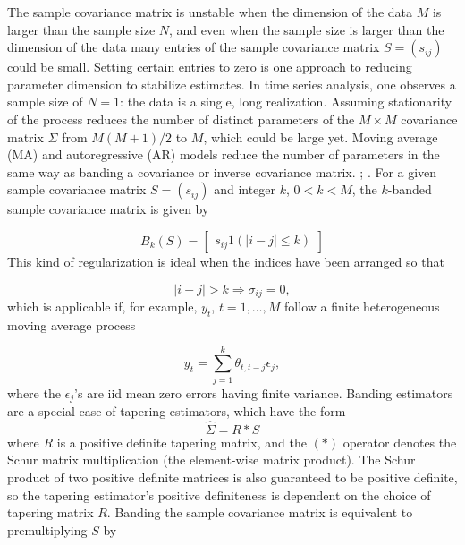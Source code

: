 The sample covariance matrix is unstable when the dimension of the data $M$ is larger than the sample size $N$, and even when the sample size is larger than the dimension of the data many entries of the sample covariance matrix $S = \left(s_{ij} \right)$ could be small. Setting certain entries to zero is one approach to reducing parameter dimension to stabilize estimates. In time series analysis, one observes a sample size of $N = 1$: the data is a single, long realization. Assuming stationarity of the process reduces the number of distinct parameters of the $M \times M$ covariance matrix $\Sigma$ from $M\left(M + 1\right)/2$ to $M$, which could be large yet. Moving average (MA) and autoregressive (AR) models reduce the number of parameters in the same way as banding a covariance or inverse covariance matrix. \cite{bickel2008regularized}; \cite{wu2009banding}. For a given sample covariance matrix $S = \left(s_{ij} \right)$ and integer $k$, $0 < k < M$, the $k$-banded sample covariance matrix is given by

\begin{equation} \label{eq:general-banded-estimator} 
B_k\left(S\right) = \begin{bmatrix} s_{ij} 1\left(\vert i-j \vert \le k\right) \end{bmatrix}
\end{equation}
\noindent
This kind of regularization is ideal when the indices have been arranged so that

\[
\vert i -  j\vert > k \Rightarrow  \sigma_{ij} = 0,
\]
which is applicable if, for example, $y_t$, $t = 1, \dots,M$ follow a finite heterogeneous moving average process

\begin{equation*} 
y_t = \sum_{j = 1}^k \theta_{t, t-j} \epsilon_j,
\end{equation*}
\noindent
where the $\epsilon_j$'s are iid mean zero errors having finite variance. Banding estimators are a special case of tapering estimators, which have the form
\begin{equation} \label{eq:general-tapering-estimator} 
\hat{\Sigma} = R \ast S 
\end{equation}
\noindent
where $R$ is a positive definite tapering matrix, and the $\left( \ast \right)$ operator denotes the Schur matrix multiplication (the element-wise matrix product). The Schur product of two positive definite matrices is also guaranteed to be positive definite, so the tapering estimator's positive definiteness is dependent on the choice of tapering matrix $R$. Banding the sample covariance matrix is equivalent to premultiplying $S$ by 


